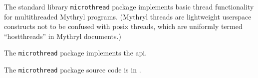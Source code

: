 
The standard library {\tt microthread} package implements basic thread functionality for multithreaded Mythryl programs.
(Mythryl threads are lightweight userspace constructs not to be confused with posix threads, which are 
uniformly termed ``hostthreads'' in Mythryl documents.)

The {\tt microthread} package implements the  api.

The {\tt microthread} package source code is in .
